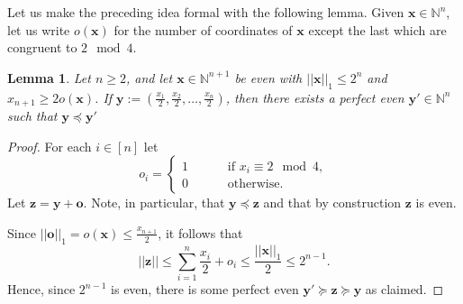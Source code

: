 \documentclass{article}
\newtheorem{lemma}[theorem]{Lemma}
\begin{document}
Let us make the preceding idea formal with the following lemma. Given $\bm{x} \in \mathbb{N}^n$, let us write $o(\bm{x})$ for the number of coordinates of $\bm{x}$ except the last which are congruent to $2 \mod 4$.

\begin{lemma}\label{l:first}
Let $n\geq 2$, and let $\bm{x} \in \mathbb{N}^{n+1}$ be even with $||\bm{x}||_1 \leq 2^{n}$ and $x_{n+1} \geq 2 o(\bm{x})$. If $\bm{y} := \left(\frac{x_1}{2},\frac{x_2}{2}, \ldots, \frac{x_n}{2}\right)$, then there exists a perfect even $\bm{y'} \in \mathbb{N}^n$ such that $\bm{y} \preceq \bm{y'}$
\end{lemma}

\begin{proof}
For each $i \in [n]$ let 
\[
o_i = \begin{cases} 1 \qquad &\text{ if } x_i \equiv 2 \mod 4,\\
0 \qquad &\text{ otherwise}.\end{cases}
\]
Let $\bm{z} = \bm{y} + \bm{o}$. Note, in particular, that $\bm{y} \preceq \bm{z}$ and that by construction $\bm{z}$ is even.

Since $||\bm{o}||_1 = o(\bm{x}) \leq \frac{x_{n+1}}{2}$, it follows that 
\[
||\bm{z}|| \leq \sum_{i=1}^n \frac{x_i}{2} + o_i \leq \frac{||\bm{x}||_1}{2} \leq 2^{n-1}.
\]
Hence, since $2^{n-1}$ is even, there is some perfect even $\bm{y'} \succeq \bm{z} \succeq \bm{y}$ as claimed.
\end{proof}
\end{document}
